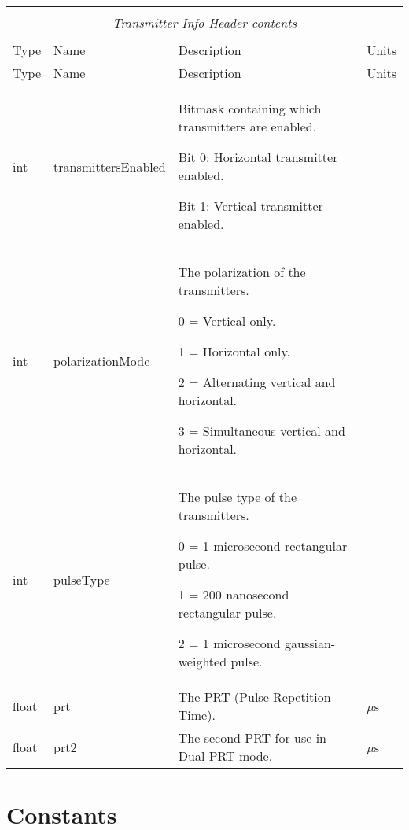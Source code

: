 \documentclass[10pt]{article}
\newcommand{\tblspc}{\rule{0pt}{3ex}}
\begin{document}
\begin{longtable}{|p{}|l|p{}|p{}|}
\hline
\multicolumn{4}{|c|}{} \\
\multicolumn{4}{|c|}{\emph{Transmitter Info Header contents}} \\
\multicolumn{4}{|c|}{} \\
\hline Type & Name & Description & Units \\ \hline \endfirsthead
\hline Type & Name & Description & Units \\ \hline \endhead
\hline \endfoot
\tblspc int & transmittersEnabled & Bitmask containing which transmitters are enabled.
	\par Bit 0: Horizontal transmitter enabled.
	\par Bit 1: Vertical transmitter enabled. & \\
\hline
\tblspc int & polarizationMode & The polarization of the transmitters.
	\par 0 = Vertical only.
	\par 1 = Horizontal only.
	\par 2 = Alternating vertical and horizontal.
	\par 3 = Simultaneous vertical and horizontal. & \\
\hline
\tblspc int & pulseType & The pulse type of the transmitters.
	\par 0 = 1 microsecond rectangular pulse.
	\par 1 = 200 nanosecond rectangular pulse.
	\par 2 = 1 microsecond gaussian-weighted pulse. & \\
\hline
\tblspc float & prt & The PRT (Pulse Repetition Time). & $\mu$s \\
\hline
\tblspc float & prt2 & The second PRT for use in Dual-PRT mode. & $\mu$s \\
\hline
\end{longtable}
\newpage


\section{Constants}
\label{sec:constants}
\end{document}
